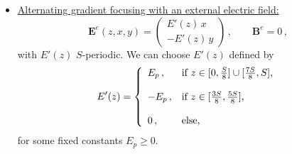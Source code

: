 \documentclass[10pt]{article}
\begin{document}
\begin{itemize}
\item \underline{Alternating gradient focusing with an external electric field:}
\begin{equation}
\mathbf{E}^{e}(z,x,y) = \left(
\begin{array}{c}
E'(z)\,x \\ -E'(z)\,y
\end{array}
\right) \, , \qquad \mathbf{B}^{e} = 0 \, ,
\end{equation}
with $E'(z)$ $S$-periodic. We can choose $E'(z)$ defined by
\begin{equation}
E'(z) = \left\{
\begin{array}{ll}
E_{p} \, , & \textnormal{if $z \in [0,\frac{S}{8}] \cup [\frac{7S}{8},S]$,} \\ \\
-E_{p} \, , & \textnormal{if $z \in [\frac{3S}{8},\frac{5S}{8}]$,} \\ \\
0 \, , & \textnormal{else,}
\end{array}
\right.
\end{equation}
for some fixed constants $E_{p} \geq 0$.


\end{itemize}
\end{document}
